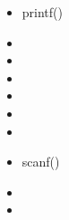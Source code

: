 \begin{itemize}
\item printf()
\item %
\item %
\item %
\item %
\item %
\item %
\item scanf()
\item %
\item %
\end{itemize}